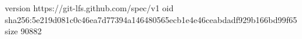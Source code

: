 version https://git-lfs.github.com/spec/v1
oid sha256:5e219d081c0c46ea7d77394a146480565ecb1e4e46ceabdadf929b166bd99f65
size 90882
